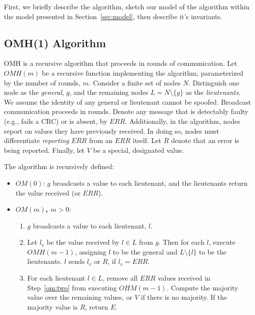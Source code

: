 \documentclass{llncs/llncs}
\begin{document}
First, we briefly describe the algorithm, sketch our model of the algorithm within the model presented in Section~\ref{sec:model}, then describe it's invariants.

\subsection{OMH(1) Algorithm}
OMH is a recursive algorithm that proceeds in rounds of communication. Let $OMH(m)$ be a recursive function implementing the algorithm, parameterized by the number of rounds, $m$. Consider a finite set of nodes $N$. Distinguish one node as the \emph{general}, $g$, and the remaining nodes $L = N \setminus \{g\}$ as the \emph{lieutenants}. We assume the identity of any general or lieutenant cannot be spoofed. Broadcast communication proceeds in rounds. Denote any message that is detectably faulty (e.g., fails a CRC) or is absent, by $ERR$. Additionally, in the algorithm, nodes report on values they have previously received. In doing so, nodes must differentiate \emph{reporting} $ERR$ from an $ERR$ itself. Let $R$ denote that an error is being reported. Finally, let $V$ be a special, designated value.


The algorithm is recursively defined:

\begin{itemize}
\item {\bf $OM(0)$}: $g$ broadcasts a value to each lieutenant, and the lieutenants return the value received (or $ERR$).
\item {\bf $OM(m)$, $m > 0$}:
  \begin{enumerate}
  \item $g$ broadcasts a value to each lieutenant, $l$.
  \item\label{om:two} Let $l_v$ be the value received by $l \in L$ from $g$. Then for each $l$, execute $OMH(m-1)$, assigning $l$ to be the general and $L \setminus \{l\}$ to be the lieutenants. $l$ sends $l_v$ or $R$, if $l_v = ERR$.
  \item For each lieutenant $l \in L$, remove all $ERR$ values received in Step~\ref{om:two} from executing $OHM(m-1)$. Compute the majority value over the remaining values, or $V$ if there is no majority. If the majority value is $R$, return $E$.
  \end{enumerate}
\end{itemize}
\end{document}
